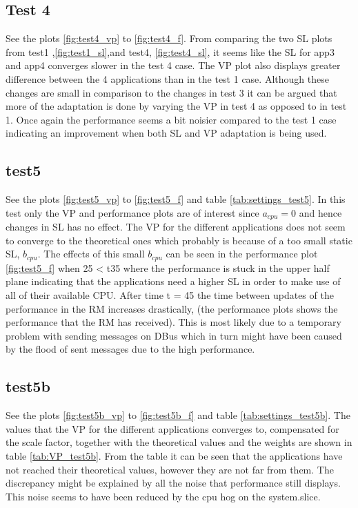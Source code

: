 \documentclass[nobiblatex]{LTHthesis}
\begin{document}
\subsection{Test 4}
See the plots \ref{fig:test4_vp} to \ref{fig:test4_f}.
From comparing the two SL plots from test1 ,\ref{fig:test1_sl},and test4, \ref{fig:test4_sl}, it seems like the SL for app3 and app4 converges slower in the test 4 case. 
The VP plot also displays greater difference between the 4 applications than in the test 1 case. Although these changes are small in comparison to the changes in test 3 it can be argued that more of the adaptation is done by varying the VP in test 4 as opposed to in test 1.
Once again the performance seems a bit noisier compared to the test 1 case indicating an improvement when both SL and VP adaptation is being used.

\subsection{test5}
See the plots \ref{fig:test5_vp} to \ref{fig:test5_f} and table \ref{tab:settings_test5}.
In this test only the VP and performance plots are of interest since $a_{cpu}=0$ and hence changes in SL has no effect.
The VP for the different applications does not seem to converge to the theoretical ones which probably is because of a too small static SL, $b_{cpu}$.
The effects of this small $b_{cpu}$ can be seen in the performance plot \ref{fig:test5_f} when 25 < t35 where the performance is stuck in the upper half plane indicating that the applications need a higher SL 
in order to make use of all of their available CPU. After time t = 45 the time between updates of the performance in the RM increases drastically, (the performance plots shows the performance that the RM has received). This is most likely due to a temporary problem with sending messages on DBus which in turn might have been caused by the flood of sent messages due to the high performance.




\subsection {test5b}
See the plots \ref{fig:test5b_vp} to \ref{fig:test5b_f} and table \ref{tab:settings_test5b}.
The values that the VP for the different applications converges to, compensated for the scale factor,  together with the theoretical values and the weights are shown in table \ref{tab:VP_test5b}.
From the table it can be seen that the applications have not reached their theoretical values, however they are not far from them.
The discrepancy might be explained by all the noise that performance still displays. This noise seems to have been reduced by the cpu hog on the system.slice.
\end{document}
